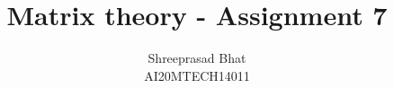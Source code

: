 \documentclass[journal,12pt,twocolumn]{IEEEtran}
\begin{document}
\makeatletter
{}
\makeatother
\let\StandardTheFigure\thefigure
\let\vec\mathbf
\renewcommand{\thefigure}{\theproblem}
\def\putbox#1#2#3{\makebox[0in][l]{\makebox[#1][l]{}\raisebox{\baselineskip}[0in][0in]{\raisebox{#2}[0in][0in]{#3}}}}
     \def\rightbox#1{\makebox[0in][r]{#1}}
     \def\centbox#1{\makebox[0in]{#1}}
     \def\topbox#1{\raisebox{-\baselineskip}[0in][0in]{#1}}
     \def\midbox#1{\raisebox{-0.5\baselineskip}[0in][0in]{#1}}
\vspace{3cm}
\title{Matrix theory - Assignment 7}
\author{Shreeprasad Bhat\\AI20MTECH14011}
%
%
%
% 
%
\end{document}
